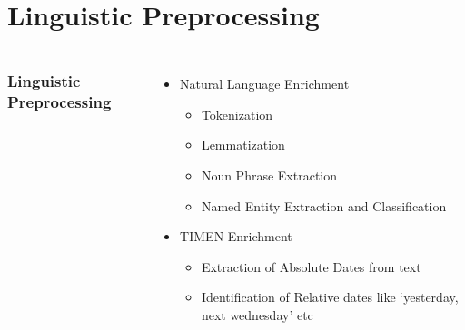 \documentclass[red,handout]{beamer}
\begin{document}
\section{Linguistic Preprocessing}
\begin{frame}
\begin{columns}
    \frametitle{Linguistic Preprocessing}
    \begin{itemize}
        \item<1->
            Natural Language Enrichment
        \begin{itemize}[<+->]
            \item
                Tokenization
            \item
                Lemmatization
            \item
                Noun Phrase Extraction
            \item
                Named Entity Extraction and Classification
        \end{itemize}
        \item<6->
            TIMEN Enrichment
        \begin{itemize}
            \item
                Extraction of Absolute Dates from text
            \item
                Identification of Relative dates like `yesterday, next wednesday' etc
        \end{itemize}
    \end{itemize}


\end{columns}
\end{frame}
\end{document}
